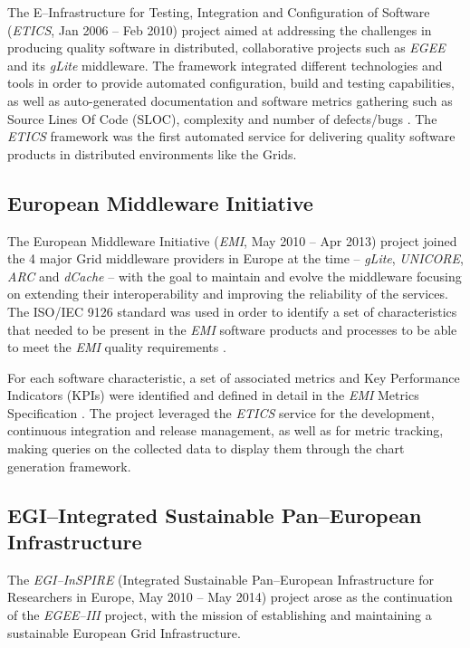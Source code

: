 \documentclass[journal]{IEEEtran}
\begin{document}
The E--Infrastructure for Testing, Integration and Configuration of Software
\cite{cordis:etics, cordis:etics2} ({\sl ETICS}, Jan 2006 -- Feb 2010) project aimed
at addressing the challenges in producing quality software in distributed,
collaborative projects such as {\sl EGEE} and its {\sl gLite} middleware. The framework
integrated different technologies and tools in order to provide automated configuration,
build and testing capabilities, as well as auto-generated documentation and
software metrics gathering such as Source Lines Of Code (SLOC), complexity and
number of defects/bugs \cite{etics}. The {\sl ETICS} framework was the first automated
service for delivering quality software products in distributed environments like
the Grids.



\subsection{European Middleware Initiative}

The European Middleware Initiative ({\sl EMI}, May 2010 -- Apr 2013)
\cite{cordis:emi} project joined the 4 major Grid middleware providers in
Europe at the time -- {\sl gLite}, {\sl UNICORE}, {\sl ARC} and {\sl dCache} --
with the goal to maintain and evolve the middleware focusing on extending their
interoperability and improving the reliability of the services. The
ISO/IEC 9126 \cite{iso-9126} standard was used in order to identify a set of
characteristics that needed to be present in the {\sl EMI} software products and
processes to be able to meet the {\sl EMI} quality requirements
\cite{emi-quality-model}.

For each software characteristic, a set of associated
metrics and Key Performance Indicators (KPIs) were identified and defined in
detail in the {\sl EMI} Metrics Specification \cite{emi-metrics}. The project
leveraged the {\sl ETICS} service for the development, continuous integration and release management,
as well as for metric tracking, making queries on the collected data to display
them through the chart generation framework.

\subsection{EGI--Integrated Sustainable Pan--European Infrastructure}

The {\sl EGI--InSPIRE} (Integrated Sustainable Pan--European Infrastructure for
Researchers in Europe, May 2010 -- May 2014) project \cite{cordis:egi-inspire}
arose as the continuation of the {\sl EGEE--III} project, with the mission of establishing and
maintaining a sustainable European Grid Infrastructure.
\end{document}
